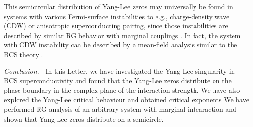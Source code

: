 \documentclass[aps,prl,twocolumn,nofootinbib,superscriptaddress,notitlepage,longbibliography]{revtex4-1}
\begin{document}
	This semicircular distribution of Yang-Lee zeros may universally be found in systems with %
	various Fermi-surface instabilities to e.g., charge-density wave (CDW) or anisotropic superconducting pairing, since those instabilities are described by similar RG behavior with marginal couplings \cite{Shankar1994}. In fact, the system with CDW instability can be described by a mean-field analysis similar to the BCS theory \cite{Gersch2005,PhysRevB.103.045142,PhysRevB.72.195106}. %
	
	
	\emph{Conclusion}.---In this Letter, we have investigated the
	Yang-Lee singularity in BCS superconductivity
	and found that the Yang-Lee zeros distribute on the phase boundary in the complex plane of the interaction strength. We have also explored the Yang-Lee critical behaviour and obtained critical exponents %
	We have performed RG analysis of an arbitrary system with marginal intearaction and shown that Yang-Lee zeros distribute on a semicircle.
	
\end{document}
